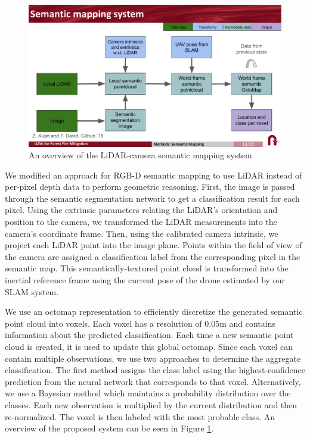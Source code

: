 \begin{figure}
    \centering
    \includegraphics[width=\textwidth, clip, trim={0 1.5cm 0 1.8cm}]{figs/methods/semantic_mapping/semantic_mapping_overview.pdf}
    \caption{An overview of the LiDAR-camera semantic mapping system}
    \label{fig:methods:lidar-camera-semantic-mapping}
\end{figure}

We modified an approach for RGB-D semantic mapping \cite{semantic_slam} to use LiDAR instead of per-pixel depth data to perform geometric reasoning. First, the image is passed through the semantic segmentation network to get a classification result for each pixel. Using the extrinsic parameters relating the LiDAR's orientation and position to the camera, we transformed the LiDAR measurements into the camera's coordinate frame. Then, using the calibrated camera intrinsic, we project each LiDAR point into the image plane. Points within the field of view of the camera are assigned a classification label from the corresponding pixel in the semantic map. This semantically-textured point cloud is transformed into the inertial reference frame using the current pose of the drone estimated by our SLAM system. 

We use an octomap \cite{hornung13auro} representation to efficiently discretize the generated semantic point cloud into voxels. Each voxel has a resolution of 0.05m and contains information about the predicted classification. Each time a new semantic point cloud is created, it is used to update this global octomap. Since each voxel can contain multiple observations, we use two approaches to determine the aggregate classification. The first method assigns the class label using the highest-confidence prediction from the neural network that corresponds to that voxel. Alternatively, we use a Bayesian method which maintains a probability distribution over the classes. Each new observation is multiplied by the current distribution and then re-normalized. The voxel is then labeled with the most probable class. An overview of the proposed system can be seen in Figure \ref{fig:methods:lidar-camera-semantic-mapping}.


